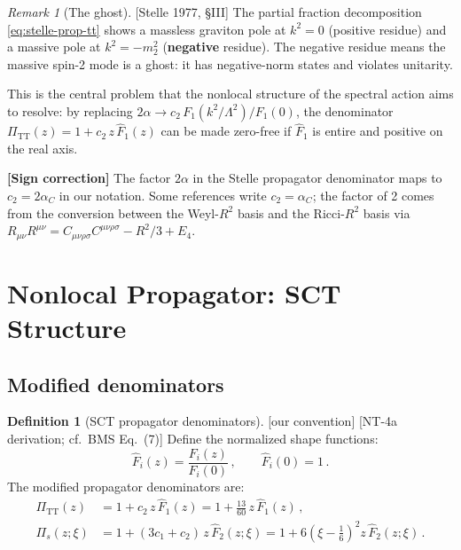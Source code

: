 \documentclass[12pt,a4paper]{article}
\theoremstyle{definition}
\newtheorem{definition}[proposition]{Definition}
\theoremstyle{remark}
\newtheorem{remark}[proposition]{Remark}
\newcommand{\Ricsq}{R_{\mu\nu}R^{\mu\nu}}
\newcommand{\Weylsq}{C_{\mu\nu\rho\sigma}C^{\mu\nu\rho\sigma}}
\newcommand{\fromlit}[1]{\textcolor{blue!70!black}{\textsf{[#1]}}}
\newcommand{\oursign}{\textcolor{teal!80!black}{\textsf{[our convention]}}}
\newcommand{\signcorrection}[1]{%
  \par\noindent\colorbox{red!10}{%
    \parbox{\dimexpr\linewidth-2\fboxsep}{%
      \textcolor{red!50!black}{\textbf{[Sign correction]}}
      \textcolor{red!50!black}{#1}%
    }%
  }\par%
}
\begin{document}
\begin{remark}[The ghost]
\fromlit{Stelle 1977, \S III}
The partial fraction decomposition \eqref{eq:stelle-prop-tt}
shows a massless graviton pole at $k^2=0$ (positive residue)
and a massive pole at $k^2 = -m_2^2$ (\textbf{negative} residue).
The negative residue means the massive spin-2 mode is a ghost:
it has negative-norm states and violates unitarity.

This is the central problem that the nonlocal structure of the
spectral action aims to resolve: by replacing $2\alpha \to
c_2\, F_1(k^2/\Lambda^2)/F_1(0)$, the denominator
$\Pi_{\text{TT}}(z) = 1 + c_2\, z\, \hat{F}_1(z)$ can be made
zero-free if $\hat{F}_1$ is entire and positive on the real axis.
\end{remark}

\signcorrection{The factor $2\alpha$ in the Stelle propagator
denominator maps to $c_2 = 2\alpha_C$ in our notation.
Some references write $c_2 = \alpha_C$; the factor of 2 comes
from the conversion between the Weyl-$R^2$ basis and the
Ricci-$R^2$ basis via $\Ricsq = \Weylsq - R^2/3 + E_4$.}


\section{Nonlocal Propagator: SCT Structure}
\label{sec:nonlocal-propagator}

\subsection{Modified denominators}

\begin{definition}[SCT propagator denominators]
\label{def:sct-denominators}
\oursign\;
\fromlit{NT-4a derivation; cf.\ BMS Eq.~(7)}
Define the normalized shape functions:
\begin{equation}
  \hat{F}_i(z) = \frac{F_i(z)}{F_i(0)}\,,
  \qquad \hat{F}_i(0) = 1\,.
  \label{eq:shape-functions}
\end{equation}
The modified propagator denominators are:
\begin{align}
  \Pi_{\text{TT}}(z) &= 1 + c_2\, z\, \hat{F}_1(z)
  = 1 + \frac{13}{60}\, z\, \hat{F}_1(z)\,,
    \label{eq:Pi-TT}\\
  \Pi_s(z;\xi) &= 1 + (3c_1+c_2)\, z\, \hat{F}_2(z;\xi)
  = 1 + 6\left(\xi-\frac{1}{6}\right)^2 z\, \hat{F}_2(z;\xi)\,.
    \label{eq:Pi-s}
\end{align}
\end{definition}
\end{document}

